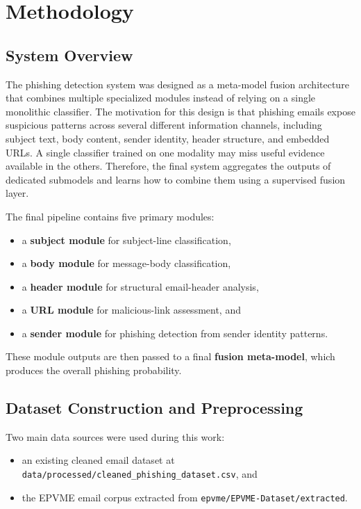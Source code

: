 \section{Methodology}

\subsection{System Overview}
The phishing detection system was designed as a meta-model fusion architecture that combines multiple specialized modules instead of relying on a single monolithic classifier. The motivation for this design is that phishing emails expose suspicious patterns across several different information channels, including subject text, body content, sender identity, header structure, and embedded URLs. A single classifier trained on one modality may miss useful evidence available in the others. Therefore, the final system aggregates the outputs of dedicated submodels and learns how to combine them using a supervised fusion layer.

The final pipeline contains five primary modules:
\begin{itemize}
  \item a \textbf{subject module} for subject-line classification,
  \item a \textbf{body module} for message-body classification,
  \item a \textbf{header module} for structural email-header analysis,
  \item a \textbf{URL module} for malicious-link assessment, and
  \item a \textbf{sender module} for phishing detection from sender identity patterns.
\end{itemize}

These module outputs are then passed to a final \textbf{fusion meta-model}, which produces the overall phishing probability.

\subsection{Dataset Construction and Preprocessing}
Two main data sources were used during this work:
\begin{itemize}
  \item an existing cleaned email dataset at \texttt{data/processed/cleaned\_phishing\_dataset.csv}, and
  \item the EPVME email corpus extracted from \texttt{epvme/EPVME-Dataset/extracted}.
\end{itemize}


